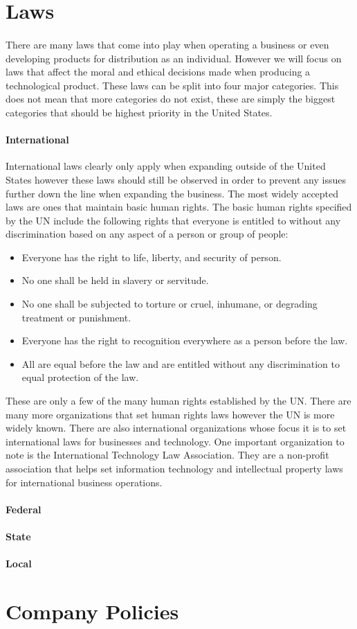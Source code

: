 \documentclass[a4paper,12pt]{article}
\begin{document}
\section*{Laws}
\paragraph{}There are many laws that come into play when operating a business or even developing products for distribution as an individual. However we will focus on laws that affect the moral and ethical decisions made when producing a technological product. These laws can be split into four major categories. This does not mean that more categories do not exist, these are simply the biggest categories that should be highest priority in the United States.
\paragraph{International}International laws clearly only apply when expanding outside of the United States however these laws should still be observed in order to prevent any issues further down the line when expanding the business. The most widely accepted laws are ones that maintain basic human rights. The basic human rights specified by the UN include the following rights that everyone is entitled to without any discrimination based on any aspect of a person or group of people:
	\begin{itemize}
	\item Everyone has the right to life, liberty, and security of person.
	\item No one shall be held in slavery or servitude.
	\item No one shall be subjected to torture or cruel, inhumane, or degrading treatment or punishment.
	\item Everyone has the right to recognition everywhere as a person before the law.
	\item All are equal before the law and are entitled without any discrimination to equal protection of the law.
	\end{itemize}
These are only a few of the many human rights established by the UN. There are many more organizations that set human rights laws however the UN is more widely known. There are also international organizations whose focus it is to set international laws for businesses and technology. One important organization to note is the International Technology Law Association. They are a non-profit association that helps set information technology and intellectual property laws for international business operations.
\paragraph{Federal}
\paragraph{State}
\paragraph{Local}
\section*{Company Policies}
\end{document}
